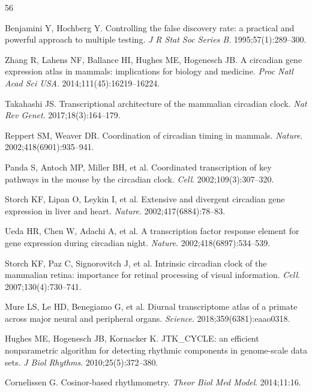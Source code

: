 \documentclass[11pt,letterpaper]{article}
\begin{document}

\begin{thebibliography}{56}

Benjamini Y, Hochberg Y.
Controlling the false discovery rate: a practical and powerful approach to multiple testing.
\textit{J R Stat Soc Series B}. 1995;57(1):289--300.

Zhang R, Lahens NF, Ballance HI, Hughes ME, Hogenesch JB.
A circadian gene expression atlas in mammals: implications for biology and medicine.
\textit{Proc Natl Acad Sci USA}. 2014;111(45):16219--16224.

Takahashi JS.
Transcriptional architecture of the mammalian circadian clock.
\textit{Nat Rev Genet}. 2017;18(3):164--179.

Reppert SM, Weaver DR.
Coordination of circadian timing in mammals.
\textit{Nature}. 2002;418(6901):935--941.

Panda S, Antoch MP, Miller BH, et al.
Coordinated transcription of key pathways in the mouse by the circadian clock.
\textit{Cell}. 2002;109(3):307--320.

Storch KF, Lipan O, Leykin I, et al.
Extensive and divergent circadian gene expression in liver and heart.
\textit{Nature}. 2002;417(6884):78--83.

Ueda HR, Chen W, Adachi A, et al.
A transcription factor response element for gene expression during circadian night.
\textit{Nature}. 2002;418(6897):534--539.

Storch KF, Paz C, Signorovitch J, et al.
Intrinsic circadian clock of the mammalian retina: importance for retinal processing of visual information.
\textit{Cell}. 2007;130(4):730--741.

Mure LS, Le HD, Benegiamo G, et al.
Diurnal transcriptome atlas of a primate across major neural and peripheral organs.
\textit{Science}. 2018;359(6381):eaao0318.

Hughes ME, Hogenesch JB, Kornacker K.
JTK\_CYCLE: an efficient nonparametric algorithm for detecting rhythmic components in genome-scale data sets.
\textit{J Biol Rhythms}. 2010;25(5):372--380.

Cornelissen G.
Cosinor-based rhythmometry.
\textit{Theor Biol Med Model}. 2014;11:16.


\end{thebibliography}
\end{document}
